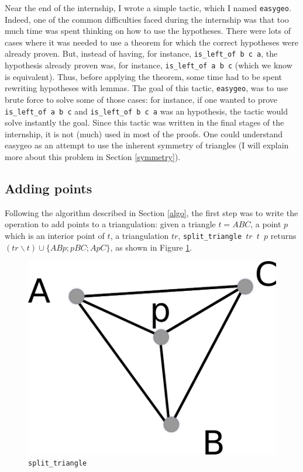 \documentclass[a4paper,10pt]{article}
\begin{document}
Near the end of the internship, I wrote a simple tactic, which I named {\tt easygeo}\label{easygeo}. Indeed, one of the common difficulties faced during the internship was that too much time was spent thinking on how to use the hypotheses. There were lots of cases where it was needed to use a theorem for which the correct hypotheses were already proven. But, instead of having, for instance, {\tt is\_left\_of b c a}, the hypothesis already proven was, for instance, {\tt is\_left\_of a b c} (which we know is equivalent). Thus, before applying the theorem, some time had to be spent rewriting hypotheses with lemmas. The goal of this tactic, {\tt easygeo}, was to use brute force to solve some of those cases: for instance, if one wanted to prove {\tt is\_left\_of a b c} and {\tt is\_left\_of b c a} was an hypothesis, the tactic would solve instantly the goal. Since this tactic was written in the final stages of the internship, it is not (much) used in most of the proofs. One could understand easygeo as an attempt to use the inherent symmetry of triangles (I will explain more about this problem in Section \ref{symmetry}).
\label{easygeo}
\subsection{Adding points}
\label{theorem1}
Following the algorithm described in Section \ref{algo}, the first step was to write the operation to add points to a triangulation: given a triangle $t = ABC$, a point $p$ which is an interior point of $t$, a triangulation $tr$, {\tt split\_triangle $tr$ $t$ $p$} returns $(tr \smallsetminus t) \cup \{ABp;pBC;ApC\}$, as shown in Figure \ref{split_triangle}.
\begin{figure}
  \centering
  \includegraphics[scale=2]{split_triangle}
    \caption{\label{split_triangle} {\tt split\_triangle}}
\end{figure}
\end{document}
